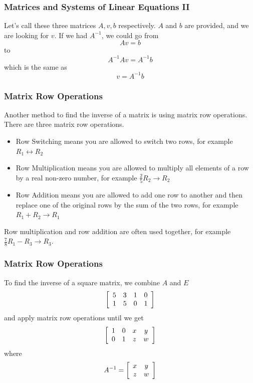 \documentclass[xcolor=dvipsnames]{beamer}
\begin{document}
\begin{frame}
  \frametitle{Matrices and Systems of Linear Equations II}
Let's call these three matrices $A,v,b$ respectively. $A$ and $b$ are
provided, and we are looking for $v$. If we had $A^{-1}$, we could go
from
\begin{equation}
  \label{eq:baixieda}
  Av=b
\end{equation}
to
\begin{equation}
  \label{eq:maethung}
  A^{-1}Av=A^{-1}b
\end{equation}
which is the same as
\begin{equation}
  \label{eq:leighuga}
  v=A^{-1}b
\end{equation}
\end{frame}

\begin{frame}
  \frametitle{Matrix Row Operations}
  Another method to find the inverse of a matrix is using
  \alert{matrix row operations}. There are three matrix row
  operations.
\begin{itemize}
\item \alert{Row Switching} means you are allowed to switch two rows,
  for example $R_{1}\leftrightarrow{}R_{2}$
\item \alert{Row Multiplication} means you are allowed to multiply all
  elements of a row by a real non-zero number, for example
  $\frac{2}{5}R_{2}\rightarrow{}R_{2}$
\item \alert{Row Addition} means you are allowed to add one row to
  another and then replace one of the original rows by the sum of the
  two rows, for example $R_{1}+R_{2}\rightarrow{}R_{1}$
\end{itemize}
Row multiplication and row addition are often used together, for
example $\frac{7}{8}R_{1}-R_{3}\rightarrow{}R_{3}$.
\end{frame}

\begin{frame}
  \frametitle{Matrix Row Operations}
To find the inverse of a square matrix, we combine $A$ and $E$
  \begin{equation}
    \label{eq:aurohbac}
  \left[\begin{array}{cccc}
 5 & 3 & 1 & 0 \\
 1 & 5 & 0 & 1
  \end{array}\right]\notag
  \end{equation}
and apply matrix row operations until we get
  \begin{equation}
    \label{eq:nahshooh}
  \left[\begin{array}{cccc}
 1 & 0 & x & y \\
 0 & 1 & z & w
  \end{array}\right]\notag
  \end{equation}
where
  \begin{equation}
    \label{eq:aecocaeh}
  A^{-1}=\left[\begin{array}{cc}
 x & y  \\
 z & w 
  \end{array}\right]\notag
  \end{equation}
\end{frame}
\end{document}
